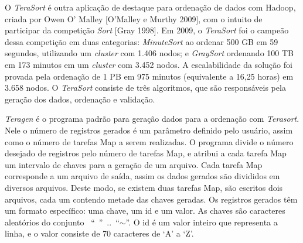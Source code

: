 %
%
%
%





O \textit{TeraSort} é outra aplicação de destaque para ordenação de dados com Hadoop, criada por Owen O' Malley [O'Malley e Murthy 2009], com o intuito de participar da competição \textit{Sort} [Gray 1998]. Em 2009, o \textit{TeraSort} foi o campeão dessa competição em duas categorias: \textit{MinuteSort} ao ordenar 500 GB em 59 segundos, utilizando um \textit{cluster} com 1.406 nodos; e \textit{GraySort} ordenando 100 TB em 173 minutos em um \textit{cluster} com 3.452 nodos. A escalabilidade da solução foi provada pela ordenação de 1 PB em 975 minutos (equivalente a 16,25 horas) em 3.658 nodos.
O \textit{TeraSort} consiste de três algoritmos, que são responsáveis pela geração dos dados, ordenação e validação. 

\textit{Teragen} é o programa padrão para geração dados para a ordenação com \textit{Terasort}.
Nele o número de registros gerados é um parâmetro definido pelo usuário, assim como o número de tarefas Map a serem realizadas. O programa divide o número desejado de registros pelo número de tarefas Map, e atribui a cada tarefa Map um intervalo de chaves para a geração de um arquivo. Cada tarefa Map corresponde a um arquivo de saída, assim os dados gerados são divididos em diversos arquivos. Deste modo, se existem duas tarefas Map, são escritos dois arquivos, cada um contendo metade das chaves geradas. 
Os registros gerados têm um formato específico: uma chave, um id e um valor. As  chaves são caracteres aleatórios do conjunto \mbox{ `` '' .. ``$\sim$''}. O id é um valor inteiro que representa a linha, e o valor consiste de 70 caracteres de `A' a `Z'. 

